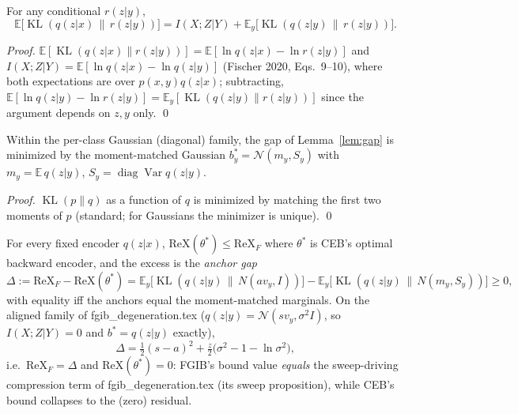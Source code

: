 \begin{lemma}\label{lem:gap}
For any conditional $r(z|y)$,
\begin{equation}
\mathbb{E}\big[\operatorname{KL}(q(z|x)\,\|\,r(z|y))\big]
= I(X;Z|Y) + \mathbb{E}_y\big[\operatorname{KL}(q(z|y)\,\|\,r(z|y))\big] .
\label{eq:gap}
\end{equation}
\end{lemma}

\begin{proof}
$\mathbb{E}[\operatorname{KL}(q(z|x)\|r(z|y))] = \mathbb{E}[\ln q(z|x) - \ln r(z|y)]$
and $I(X;Z|Y) = \mathbb{E}[\ln q(z|x) - \ln q(z|y)]$ (Fischer 2020, Eqs.~9--10), where
both expectations are over $p(x,y)q(z|x)$; subtracting,
$\mathbb{E}[\ln q(z|y) - \ln r(z|y)] = \mathbb{E}_y[\operatorname{KL}(q(z|y)\|r(z|y))]$
since the argument depends on $z, y$ only. \hfill\qed
\end{proof}

\begin{lemma}\label{lem:mm}
Within the per-class Gaussian (diagonal) family, the gap of Lemma~\ref{lem:gap} is
minimized by the moment-matched Gaussian $b^*_y = \mathcal{N}(m_y, S_y)$ with
$m_y = \mathbb{E}\,q(z|y)$, $S_y = \operatorname{diag}\operatorname{Var} q(z|y)$.
\end{lemma}

\begin{proof}
$\operatorname{KL}(p\|q)$ as a function of $q$ is minimized by matching the first two
moments of $p$ (standard; for Gaussians the minimizer is unique). \hfill\qed
\end{proof}

\begin{proposition}\label{prop:ordering}
For every fixed encoder $q(z|x)$,
$\mathrm{ReX}(\theta^*) \le \mathrm{ReX}_F$ where $\theta^*$ is CEB's optimal backward
encoder, and the excess is the \emph{anchor gap}
\begin{equation}
\Delta := \mathrm{ReX}_F - \mathrm{ReX}(\theta^*)
= \mathbb{E}_y\big[\operatorname{KL}(q(z|y)\,\|\,N(a v_y, I))\big]
- \mathbb{E}_y\big[\operatorname{KL}(q(z|y)\,\|\,N(m_y, S_y))\big] \ge 0 ,
\label{eq:anchor-gap}
\end{equation}
with equality iff the anchors equal the moment-matched marginals.
On the aligned family of fgib\_degeneration.tex ($q(z|y) = \mathcal{N}(s v_y, \sigma^2 I)$, so
$I(X;Z|Y) = 0$ and $b^* = q(z|y)$ exactly),
\begin{equation}
\Delta = \tfrac{1}{2}(s-a)^2 + \tfrac{z}{2}\big(\sigma^2 - 1 - \ln\sigma^2\big) ,
\label{eq:aligned-gap}
\end{equation}
i.e.\ $\mathrm{ReX}_F = \Delta$ and $\mathrm{ReX}(\theta^*) = 0$: FGIB's bound value
\emph{equals} the sweep-driving compression term of fgib\_degeneration.tex
(its sweep proposition), while CEB's bound collapses to the (zero) residual.
\end{proposition}

